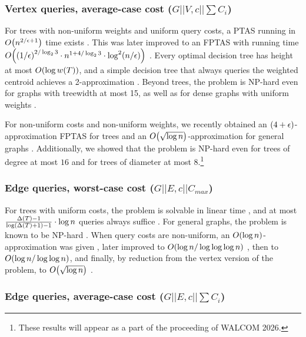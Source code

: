 \subsubsection{Vertex queries, average-case cost ($G||V,c||\sum C_i$)}

For trees with non-uniform weights and uniform query costs, a PTAS running in 
$O\mathopen{}\left( n^{2/\epsilon+1} \right)$ time exists \cite{SplayTonT}. 
This was later improved to an FPTAS with running time 
$O\mathopen{}\left( \mathopen{}\left( 1/\epsilon \right)^{2/\log_23}\cdot n^{1+4/\log_23}\cdot \log^2\mathopen{}\left( n/\epsilon \right) \right)$ 
\cite{Berendsohn2024}. 
Every optimal decision tree has height at most $O\mathopen{}\left( \log w\mathopen{}\left( T \right) \right)$, and a simple 
decision tree that always queries the weighted centroid achieves a 2-approximation 
\cite{Fast_app_centroid_trees}. 
Beyond trees, the problem is NP-hard even for graphs with treewidth at most 15, 
as well as for dense graphs with uniform weights \cite{Berendsohn2024}. 

For non-uniform costs and non-uniform weights, we recently obtained an $\mathopen{}\left( 4+\epsilon \right)$-approximation FPTAS for trees and an $O\mathopen{}\left( \sqrt{\log n} \right)$-approximation for general graphs \cite{szyfelbein2025approximatingaveragecasegraphsearch}. Additionally, we showed that the problem is NP-hard even for trees of degree at most $16$ and for trees of diameter at most $8$.\footnote{These results will appear as a part of the proceeding of WALCOM 2026.}

\subsubsection{Edge queries, worst-case cost ($G||E,c||C_{max}$)}

For trees with uniform costs, the problem is solvable in linear time 
\cite{Lam1998ERankOfGsIsH,Mozes_Onak2008FindOptTSStartInLinTime}, 
and at most 
$\frac{\Delta\mathopen{}\left( T \right)-1}{\log\mathopen{}\left( \Delta\mathopen{}\left( T \right)+1 \right)-1}\cdot \log n$ queries always suffice 
\cite{Emamjomeh2016DetAndProbBSinGs}. 
For general graphs, the problem is known to be NP-hard \cite{Lam1998ERankOfGsIsH}. 
When query costs are non-uniform, an $O\mathopen{}\left( \log n \right)$-approximation was given 
\cite{Dereniowski2009ERankOfWTs}, later improved to 
$O\mathopen{}\left( \log n/\log\log\log n \right)$ \cite{Cicalese2012BinIdentPForWTs}, then to 
$O\mathopen{}\left( \log n/\log\log n \right)$, and finally, by reduction from the vertex version of the 
problem, to $O\mathopen{}\left( \sqrt{\log n} \right)$ \cite{dereniowski2017ApproxSsForGeneralBSinWTs}.
\subsubsection{Edge queries, average-case cost ($G||E,c||\sum C_i$)}

